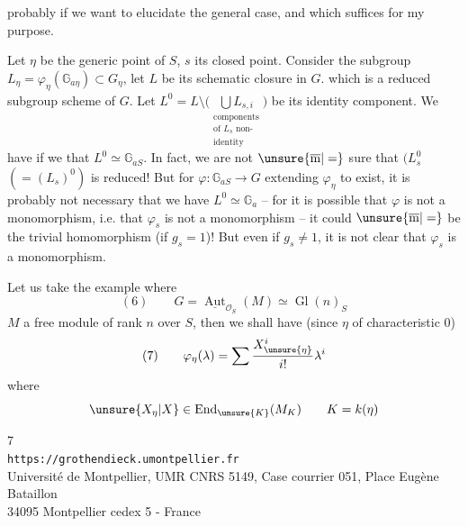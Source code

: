 
 probably if we want to elucidate the general case, and which suffices for
my purpose.

Let $\eta$ be the generic point of $S$, $s$ its closed point. Consider the
subgroup $L_\eta=\varphi_\eta(\mathbb G_{a\eta})\subset G_\eta$,
let $L$ be its schematic closure in $G$. which is a reduced subgroup scheme
of $G$. Let 
$L^0=L\setminus
\bigl(\underset{\substack{\text{components}\\\text{of }L_s\text{ non-}\\\text{identity}}}{\bigcup L_{s,i}}\bigr)$
be its identity component. We have  if we  that
$L^0\simeq\mathbb G_{aS}$. In fact, we are not
$\unsure{\overline{\mathrm m}|=}$ sure that
$(L_s^0$  $(=(L_s)^0)$ is reduced!
But for $\varphi:\mathbb G_{aS}\longrightarrow G$
 extending $\varphi_\eta$ to exist, it is probably not necessary
that we have $L^0\simeq\mathbb G_a$ -- for it is possible that
$\varphi$ is not a monomorphism, i.e. that $\varphi_s$ is not a monomorphism --
it could $\unsure{\overline{\mathrm m}|=}$ be the trivial homomorphism
(if $g_s=1$)! But even if $g_s\ne1$, it is not clear that
$\varphi_s$ is a monomorphism.

Let us take the example where
\[
(6)\qquad G=\underline{\operatorname{Aut}}_{\mathcal O_S}(M)
\simeq\operatorname{Gl}(n)_S
\]
$M$ a  free module of rank $n$ over $S$,
then we shall have (since $\eta$ of characteristic $0$)
\[
(7)\qquad
\varphi_\eta(\lambda)=\sum\frac{X^{i}_{\unsure{\eta}}}{i!}\lambda^i
\]
where
\[
\unsure{X_\eta|X}\in\operatorname{End}_{\unsure{K}}(M_K)
\qquad K=k(\eta)
\]

\begin{center}
\small
7\\
\texttt{https://grothendieck.umontpellier.fr}\\
Université de Montpellier, UMR CNRS 5149, Case courrier 051, Place Eugène Bataillon\\
34095 Montpellier cedex 5 - France
\end{center}